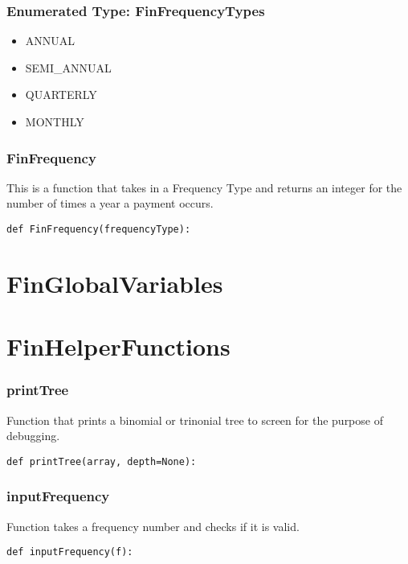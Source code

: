 \documentclass[twoside,11pt]{book}
\begin{document}
\subsubsection{Enumerated Type: FinFrequencyTypes}
\begin{itemize}
\item{ANNUAL}
\item{SEMI\_ANNUAL}
\item{QUARTERLY}
\item{MONTHLY}
\end{itemize}

\subsubsection*{{\bf FinFrequency}}
This is a function that takes in a Frequency Type and returns an integer for the number of times a year a payment occurs. 

\begin{lstlisting}
def FinFrequency(frequencyType):
\end{lstlisting}

\newpage
\section{FinGlobalVariables}

\newpage
\section{FinHelperFunctions}

\subsubsection*{{\bf printTree}}
Function that prints a binomial or trinonial tree to screen for the purpose of debugging.  

\begin{lstlisting}
def printTree(array, depth=None):
\end{lstlisting}

\subsubsection*{{\bf inputFrequency}}
Function takes a frequency number and checks if it is valid.  

\begin{lstlisting}
def inputFrequency(f):
\end{lstlisting}
\end{document}
